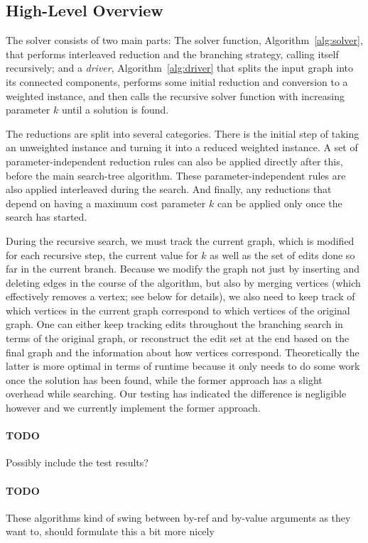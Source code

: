 \documentclass{article}
\newcommand{\todo}[1]{\paragraph{TODO} #1}
\theoremstyle{definition}
\begin{document}
\subsection{High-Level Overview}

The solver consists of two main parts: The solver function, Algorithm~\ref{alg:solver}, that
performs interleaved reduction and the branching strategy, calling itself recursively; and a
\emph{driver}, Algorithm~\ref{alg:driver} that splits the input graph into its connected components,
performs some initial reduction and conversion to a weighted instance, and then calls the recursive
solver function with increasing parameter $k$ until a solution is found. 

The reductions are split into several categories. There is the initial step of taking an
unweighted instance and turning it into a reduced weighted instance. A set of parameter-independent
reduction rules can also be applied directly after this, before the main search-tree algorithm.
These parameter-independent rules are also applied interleaved during the search. And finally, any
reductions that depend on having a maximum cost parameter $k$ can be applied only once the search
has started.

During the recursive search, we must track the current graph, which is modified for each recursive
step, the current value for $k$ as well as the set of edits done so far in the current branch.
Because we modify the graph not just by inserting and deleting edges in the course of the algorithm,
but also by merging vertices (which effectively removes a vertex; see below for details), we also
need to keep track of which vertices in the current graph correspond to which vertices of the
original graph. One can either keep tracking edits throughout the branching search in terms of the
original graph, or reconstruct the edit set at the end based on the final graph and the information
about how vertices correspond. Theoretically the latter is more optimal in terms of runtime because
it only needs to do some work once the solution has been found, while the former approach has a
slight overhead while searching. Our testing has indicated the difference is negligible however and
we currently implement the former approach.

\todo Possibly include the test results?

\todo These algorithms kind of swing between by-ref and by-value arguments as they want to, should
formulate this a bit more nicely
\end{document}
